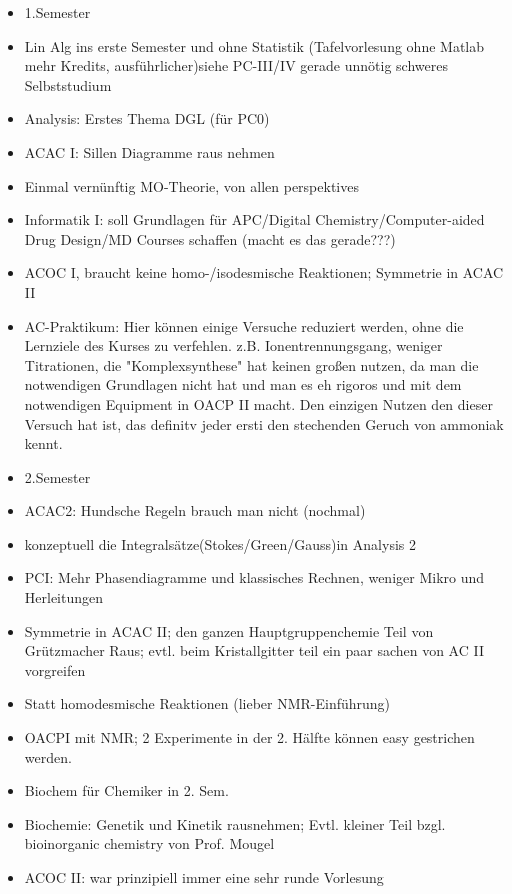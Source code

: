 \documentclass[a4paper]{article}
\begin{document}
\begin{itemize}
    \item 1.Semester\\
    \item Lin Alg ins erste Semester und ohne Statistik (Tafelvorlesung ohne Matlab mehr Kredits, ausführlicher)siehe PC-III/IV gerade unnötig schweres Selbststudium
    \item Analysis: Erstes Thema DGL (für PC0)
    \item ACAC I: Sillen Diagramme raus nehmen
    \item Einmal vernünftig MO-Theorie, von allen perspektives
    \item Informatik I: soll Grundlagen für APC/Digital Chemistry/Computer-aided Drug Design/MD Courses schaffen (macht es das gerade???)
    \item ACOC I, braucht keine homo-/isodesmische Reaktionen; Symmetrie in ACAC II
    \item AC-Praktikum: Hier können einige Versuche reduziert werden, ohne die Lernziele des Kurses zu verfehlen. z.B. Ionentrennungsgang, weniger Titrationen, die "Komplexsynthese" hat keinen großen nutzen, da man die notwendigen Grundlagen nicht hat und man es eh rigoros und mit dem notwendigen Equipment in OACP II macht. Den einzigen Nutzen den dieser Versuch hat ist, das definitv jeder ersti den stechenden Geruch von ammoniak kennt.
    \item 2.Semester\\
    \item ACAC2: Hundsche Regeln brauch man nicht (nochmal)
    \item konzeptuell die Integralsätze(Stokes/Green/Gauss)in Analysis 2
    \item PCI: Mehr Phasendiagramme und klassisches Rechnen, weniger Mikro und Herleitungen
    \item Symmetrie in ACAC II; den ganzen Hauptgruppenchemie Teil von Grützmacher Raus; evtl. beim Kristallgitter teil ein paar sachen von AC II vorgreifen
    \item Statt homodesmische Reaktionen (lieber NMR-Einführung)
    \item OACPI mit NMR; 2 Experimente in der 2. Hälfte können easy gestrichen werden.
    \item Biochem für Chemiker in 2. Sem.
    \item Biochemie: Genetik und Kinetik rausnehmen; Evtl. kleiner Teil bzgl. bioinorganic chemistry von Prof. Mougel
    \item ACOC II: war prinzipiell immer eine sehr runde Vorlesung

\end{itemize}
\end{document}
